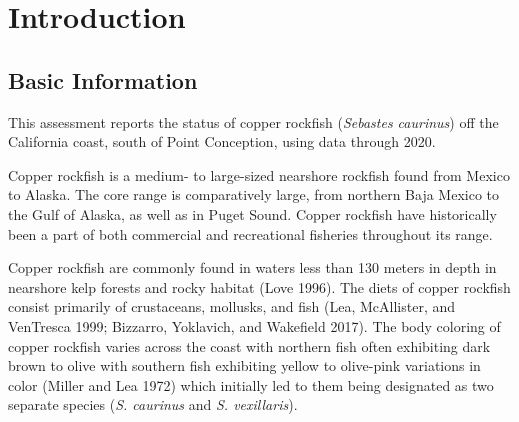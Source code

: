 \documentclass[11pt,
  english,
  a4paper,
]{article}
\begin{document}
\setcounter{table}{0}
\setcounter{figure}{0}

\setlength\parskip{0.5em plus 0.1em minus 0.2em}


\hypertarget{introduction}{%
\section{Introduction}\label{introduction}}

\leavevmode\tagmcend\tagstructend


\hypertarget{basic-information}{%
\subsection{Basic Information}\label{basic-information}}

\leavevmode\tagmcend\tagstructend


This assessment reports the status of copper rockfish (\emph{Sebastes caurinus}) off the California coast, south of Point Conception, using data through 2020.

\leavevmode\tagmcend\tagstructend\par


Copper rockfish is a medium- to large-sized nearshore rockfish found from Mexico to Alaska. The core range is comparatively large, from northern Baja Mexico to the Gulf of Alaska, as well as in Puget Sound. Copper rockfish have historically been a part of both commercial and recreational fisheries throughout its range.

\leavevmode\tagmcend\tagstructend\par


Copper rockfish are commonly found in waters less than 130 meters in depth in nearshore kelp forests and rocky habitat {(Love 1996)\leavevmode\tagmcend\tagstructend}. The diets of copper rockfish consist primarily of crustaceans, mollusks, and fish {(Lea, McAllister, and VenTresca 1999; Bizzarro, Yoklavich, and Wakefield 2017)\leavevmode\tagmcend\tagstructend}. The body coloring of copper rockfish varies across the coast with northern fish often exhibiting dark brown to olive with southern fish exhibiting yellow to olive-pink variations in color {(Miller and Lea 1972)\leavevmode\tagmcend\tagstructend} which initially led to them being designated as two separate species (\emph{S. caurinus} and \emph{S. vexillaris}).
\end{document}
